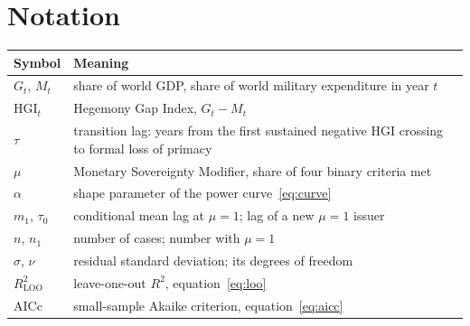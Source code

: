\documentclass[11pt,letterpaper]{article}
\theoremstyle{definition}
\theoremstyle{plain}
\newcommand{\HGI}{\mathrm{HGI}}
\begin{document}
\section{Notation}\label{app:notation}
\begin{center}\small
\begin{tabular}{@{}ll@{}}\toprule
Symbol & Meaning\\\midrule
$G_t$, $M_t$ & share of world GDP, share of world military expenditure in year $t$\\
$\HGI_t$ & Hegemony Gap Index, $G_t-M_t$\\
$\tau$ & transition lag: years from the first sustained negative HGI crossing to formal loss of primacy\\
$\mu$ & Monetary Sovereignty Modifier, share of four binary criteria met\\
$\alpha$ & shape parameter of the power curve~\eqref{eq:curve}\\
$m_1$, $\tau_0$ & conditional mean lag at $\mu=1$; lag of a new $\mu=1$ issuer\\
$n$, $n_1$ & number of cases; number with $\mu=1$\\
$\hat\sigma$, $\nu$ & residual standard deviation; its degrees of freedom\\
$R^2_{\mathrm{LOO}}$ & leave-one-out $R^2$, equation~\eqref{eq:loo}\\
AICc & small-sample Akaike criterion, equation~\eqref{eq:aicc}\\\bottomrule
\end{tabular}
\end{center}
\end{document}
